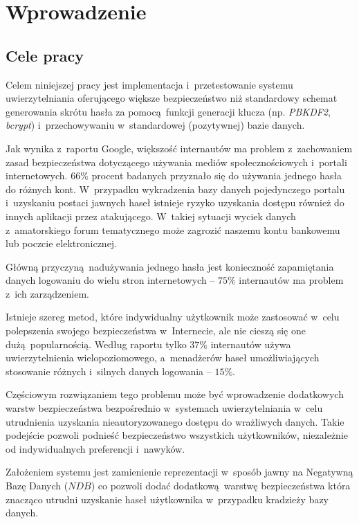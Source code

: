 \chapter{Wprowadzenie}
\label{chp:intro}
\section{Cele pracy}
Celem niniejszej pracy jest implementacja i~przetestowanie systemu uwierzytelniania oferującego większe bezpieczeństwo
niż standardowy schemat generowania skrótu hasła za pomocą funkcji generacji klucza (np. \textit{PBKDF2}, \textit{bcrypt})
i~przechowywaniu w~standardowej (pozytywnej) bazie danych.
    
Jak wynika z~raportu Google\cite{google-poll}, większość internautów ma problem z~zachowaniem zasad bezpieczeństwa dotyczącego 
używania mediów społecznościowych i~portali internetowych. $66\%$ procent badanych przyznało się do używania jednego hasła do różnych kont. 
W~przypadku wykradzenia bazy danych pojedynczego portalu i~uzyskaniu postaci jawnych haseł istnieje ryzyko uzyskania dostępu również do innych aplikacji
przez atakującego. W~takiej sytuacji wyciek danych z~amatorskiego forum tematycznego może zagrozić naszemu kontu bankowemu lub poczcie elektronicznej.

Główną przyczyną nadużywania jednego hasła jest konieczność zapamiętania danych logowaniu do wielu stron internetowych -- $75\%$ internautów ma problem z~ich zarządzeniem.
  
Istnieje szereg metod, które indywidualny użytkownik może zastosować w~celu polepszenia swojego bezpieczeństwa w~Internecie, ale nie cieszą
się one dużą popularnością. Według raportu tylko $37\%$ internautów używa uwierzytelnienia wielopoziomowego, a~menadżerów haseł
umożliwiających stosowanie różnych i~silnych danych logowania -- $15\%$.

Częściowym rozwiązaniem tego problemu może być wprowadzenie dodatkowych warstw bezpieczeństwa bezpośrednio w~systemach uwierzytelniania
w~celu utrudnienia uzyskania nieautoryzowanego dostępu do wrażliwych danych. Takie podejście pozwoli podnieść bezpieczeństwo wszystkich użytkowników,
niezależnie od indywidualnych preferencji i~nawyków.
 
Założeniem systemu jest zamienienie reprezentacji w~sposób jawny na Negatywną Bazę Danych ($NDB$) co pozwoli dodać 
dodatkową warstwę bezpieczeństwa która znacząco utrudni uzyskanie haseł użytkownika w~przypadku kradzieży bazy danych.


